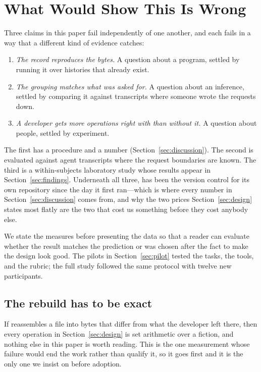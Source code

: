 \section{What Would Show This Is Wrong}
\label{sec:study}

Three claims in this paper fail independently of one another, and each fails in a
way that a different kind of evidence catches:

\begin{enumerate}
\item \emph{The record reproduces the bytes.} A question about a program, settled
  by running it over histories that already exist.
\item \emph{The grouping matches what was asked for.} A question about an
  inference, settled by comparing it against transcripts where someone wrote
  the requests down.
\item \emph{A developer gets more operations right with \sgt{} than without it.}
  A question about people, settled by experiment.
\end{enumerate}

\noindent The first has a procedure and a number
(Section~\ref{sec:discussion}). The second is evaluated against agent transcripts
where the request boundaries are known. The third is a within-subjects laboratory
study whose results appear in Section~\ref{sec:findings}. Underneath all three,
\sgt{} has been the version control for its own repository since the day it first
ran---which is where every number in Section~\ref{sec:discussion} comes from, and
why the two prices Section~\ref{sec:design} states most flatly are the two that
cost us something before they cost anybody else.

\smallskip\noindent We state the measures before presenting the data so that a
reader can evaluate whether the result matches the prediction or was chosen after
the fact to make the design look good. The pilots in
Section~\ref{sec:pilot} tested the tasks, the tools, and the rubric; the full
study followed the same protocol with twelve new participants.

\subsection{The rebuild has to be exact}
\label{sec:eval-exact}

If \sgt{} reassembles a file into bytes that differ from what the developer left
there, then every operation in Section~\ref{sec:design} is set arithmetic over a
fiction, and nothing else in this paper is worth reading. This is the one
measurement whose failure would end the work rather than qualify it, so it goes
first and it is the only one we insist on before adoption.

